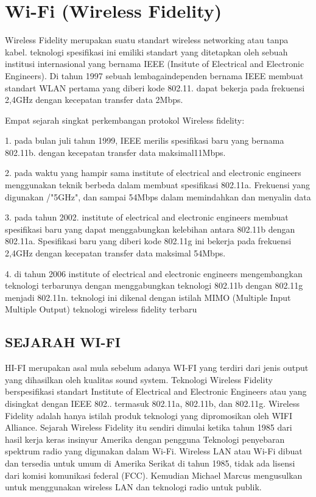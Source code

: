 
\section {Wi-Fi (Wireless Fidelity)}
Wireless Fidelity merupakan suatu standart wireless networking atau tanpa kabel. teknologi spesifikasi ini emiliki standart yang 
ditetapkan oleh sebuah institusi internasional yang bernama IEEE  (Insitute of Electrical and Electronic Engineers). Di tahun 1997 
sebuah lembagaindependen bernama IEEE membuat standart WLAN pertama yang diberi kode 802.11. dapat bekerja pada frekuensi 2,4GHz 
dengan kecepatan transfer data 2Mbps.

Empat sejarah singkat perkembangan protokol Wireless fidelity:

1. pada bulan juli tahun 1999, IEEE merilis spesifikasi baru yang bernama 802.11b. dengan kecepatan transfer data maksimal11Mbps.

2. pada waktu yang hampir sama institute of electrical and electronic engineers menggunakan teknik berbeda dalam membuat spesifikasi 
802.11a. Frekuensi yang  digunakan /"5GHz", dan sampai 54Mbps dalam memindahkan dan menyalin data

3. pada tahun 2002. institute of electrical and electronic engineers membuat spesifikasi baru yang dapat menggabungkan kelebihan antara 
802.11b dengan 802.11a. Spesifikasi baru yang diberi kode 802.11g ini bekerja pada frekuensi 2,4GHz dengan kecepatan transfer data 
maksimal 54Mbps.

4. di tahun 2006 institute of electrical and electronic engineers mengembangkan teknologi terbarunya dengan menggabungkan teknologi 
802.11b dengan 802.11g menjadi 802.11n. teknologi ini dikenal dengan istilah MIMO (Multiple Input Multiple Output) teknologi wireless 
fidelity terbaru
 
\subsection {SEJARAH WI-FI}
HI-FI merupakan asal mula sebelum adanya WI-FI yang terdiri dari jenis output yang dihasilkan oleh kualitas sound system. Teknologi Wireless Fidelity berspesifikasi standart Institute of Electrical and Electronic Engineers atau yang disingkat dengan IEEE 802.. termasuk 802.11a, 802.11b, dan 802.11g. Wireless Fidelity adalah hanya istilah produk teknologi yang dipromosikan oleh WIFI Alliance.
Sejarah Wireless Fidelity itu sendiri dimulai ketika tahun 1985 dari hasil kerja keras insinyur Amerika dengan pengguna Teknologi penyebaran spektrum radio yang digunakan dalam Wi-Fi. Wireless LAN atau Wi-Fi dibuat dan tersedia untuk umum di Amerika Serikat di tahun 1985, tidak ada lisensi dari komisi komunikasi federal (FCC). Kemudian Michael Marcus mengusulkan untuk menggunakan wireless LAN dan teknologi radio untuk publik.

